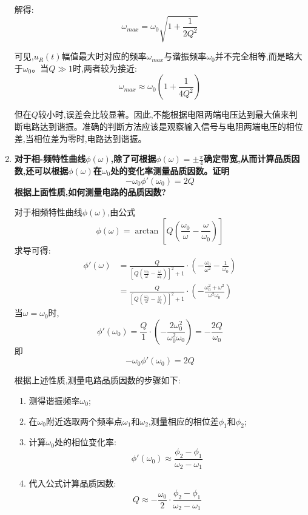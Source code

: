 \documentclass[UTF8]{ctexart}
\begin{document}
\begin{enumerate}
解得:
\begin{equation}
\omega_{max} = \omega_0\sqrt{1 + \frac{1}{2Q^2}}
\end{equation}

可见,$u_R(t)$幅值最大时对应的频率$\omega_{max}$与谐振频率$\omega_0$并不完全相等,而是略大于$\omega_0$。当$Q \gg 1$时,两者较为接近:
\begin{equation}
\omega_{max} \approx \omega_0(1 + \frac{1}{4Q^2})
\end{equation}

但在$Q$较小时,误差会比较显著。因此,不能根据电阻两端电压达到最大值来判断电路达到谐振。准确的判断方法应该是观察输入信号与电阻两端电压的相位差,当相位差为零时,电路达到谐振。
    
    \item \textbf{对于相-频特性曲线$\phi(\omega)$,除了可根据$\phi(\omega)=\pm\frac{\pi}{4}$确定带宽,从而计算品质因数,还可以根据$\phi(\omega)$在$\omega_0$处的变化率测量品质因数。证明
    \begin{equation*}
        -\omega_0\phi'(\omega_0)=2Q
    \end{equation*}
    根据上面性质,如何测量电路的品质因数?}
    
    对于相频特性曲线$\phi(\omega)$,由公式
\begin{equation}
\phi(\omega) = \arctan\left[Q\left(\frac{\omega_0}{\omega} - \frac{\omega}{\omega_0}\right)\right]
\end{equation}
求导可得:
\begin{align}
\phi'(\omega) &= \frac{Q}{\left[Q\left(\frac{\omega_0}{\omega} - \frac{\omega}{\omega_0}\right)\right]^2 + 1} \cdot \left(-\frac{\omega_0}{\omega^2} - \frac{1}{\omega_0}\right) \\
&= \frac{Q}{\left[Q\left(\frac{\omega_0}{\omega} - \frac{\omega}{\omega_0}\right)\right]^2 + 1} \cdot \left(-\frac{\omega_0^2 + \omega^2}{\omega^2\omega_0}\right)
\end{align}
当$\omega = \omega_0$时,
\begin{equation}
\phi'(\omega_0) = \frac{Q}{1} \cdot \left(-\frac{2\omega_0^2}{\omega_0^2\omega_0}\right) = -\frac{2Q}{\omega_0}
\end{equation}
即
\begin{equation}
-\omega_0\phi'(\omega_0) = 2Q
\end{equation}

根据上述性质,测量电路品质因数的步骤如下:
\begin{enumerate}
\item 测得谐振频率$\omega_0$;
\item 在$\omega_0$附近选取两个频率点$\omega_1$和$\omega_2$,测量相应的相位差$\phi_1$和$\phi_2$;
\item 计算$\omega_0$处的相位变化率:
\begin{equation}
\phi'(\omega_0) \approx \frac{\phi_2 - \phi_1}{\omega_2 - \omega_1}
\end{equation}
\item 代入公式计算品质因数:
\begin{equation}
Q \approx -\frac{\omega_0}{2} \cdot \frac{\phi_2 - \phi_1}{\omega_2 - \omega_1}
\end{equation}
\end{enumerate}
    
\end{enumerate}
\end{document}
